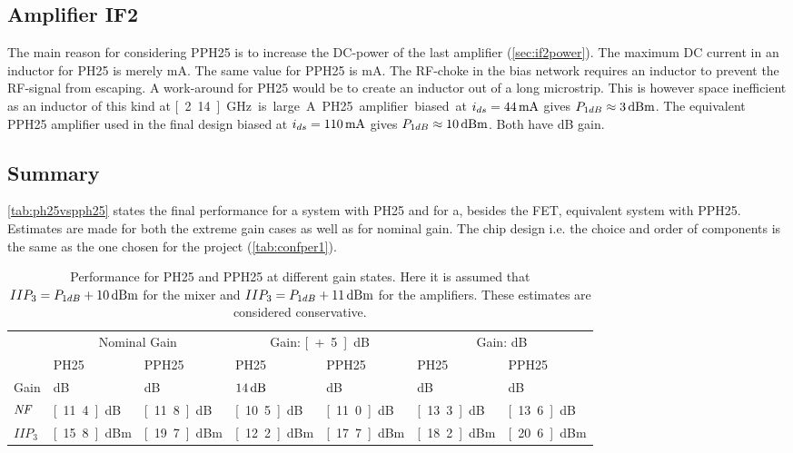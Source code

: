 		\subsection{Amplifier IF2}
			The main reason for considering PPH25 is to increase the DC-power of the last amplifier (\autoref{sec:if2power}). The maximum DC current in an inductor for PH25 is merely \unit[44]{mA}.\autocite{ph25manual} The same value for PPH25 is \unit[130]{mA}.\autocite{pph25manual} The RF-choke in the bias network requires an inductor to prevent the RF-signal from escaping. A work-around for PH25 would be to create an inductor out of a long microstrip. This is however space inefficient as an inductor of this kind at \unit[2.14]{GHz} is large.

			A PH25 amplifier biased at $i_{ds}=\unit[44]{mA}$ gives $P_{1dB}\approx \unit[3]{dBm}$. The equivalent PPH25 amplifier used in the final design biased at $i_{ds}=\unit[110]{mA}$ gives $P_{1dB}\approx \unit[10]{dBm}$. Both have \unit[12]{dB} gain.

		\subsection{Summary}
			\autoref{tab:ph25vspph25} states the final performance for a system with PH25 and for a, besides the FET, equivalent system with PPH25. Estimates are made for both the extreme gain cases as well as for nominal gain. The chip design i.e. the choice and order of components is the same as the one chosen for the project (\autoref{tab:confper1}).

			\begin{table}[hbt!]
				\caption[PH25 vs PPH25 chip performance.]{Performance for PH25 and PPH25 at different gain states. Here it is assumed that $IIP_3=P_{1dB}+\unit[10]{dBm}$ for the mixer and $IIP_3=P_{1dB}+\unit[11]{dBm}$ for the amplifiers. These estimates are considered conservative.}
				\label{tab:ph25vspph25}
				\centering
				\begin{tabular}{ l l l l l l l } \toprule
					& \multicolumn{2}{c}{Nominal Gain} & \multicolumn{2}{c}{Gain: \unit[+5]{dB}} & \multicolumn{2}{c}{Gain: \unit[-5]{dB}} \\\cmidrule{2-7}
					& PH25 & PPH25 & PH25 & PPH25 & PH25 & PPH25 \\\cmidrule{2-7}
					Gain & \unit[9]{dB} & \unit[9]{dB} & $\unit[14]{dB}$ & \unit[14]{dB} & \unit[4]{dB} & \unit[4]{dB} \\
					$\emph{NF}$ & \unit[11.4]{dB} & \unit[11.8]{dB} & \unit[10.5]{dB} & \unit[11.0]{dB} & \unit[13.3]{dB} & \unit[13.6]{dB} \\
					$IIP_3$ & \unit[15.8]{dBm} & \unit[19.7]{dBm} & \unit[12.2]{dBm} & \unit[17.7]{dBm} & \unit[18.2]{dBm} & \unit[20.6]{dBm} \\\bottomrule
				\end{tabular}
			\end{table}

